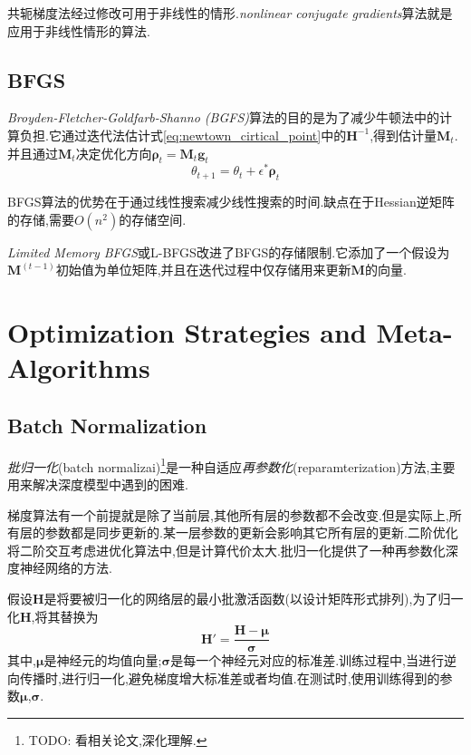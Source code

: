 共轭梯度法经过修改可用于非线性的情形.\textit{nonlinear conjugate gradients}算法就是应用于非线性情形的算法.

\subsection{BFGS}

\textit{Broyden-Fletcher-Goldfarb-Shanno (BGFS)}算法的目的是为了减少牛顿法中的计算负担.它通过迭代法估计式\ref{eq:newtown_cirtical_point}中的$\mathbf H^{-1}$,得到估计量$\mathbf M_t$.并且通过$\mathbf M_t$决定优化方向$\mathbf\rho_t=\mathbf M_t\mathbf g_t$
\begin{equation}
\theta_{t+1}=\theta_t+\epsilon^\ast\mathbf\rho_t
\end{equation}

BFGS算法的优势在于通过线性搜索减少线性搜索的时间.缺点在于Hessian逆矩阵的存储,需要$O(n^2)$的存储空间.

\textit{Limited Memory BFGS}或L-BFGS改进了BFGS的存储限制.它添加了一个假设为$\mathbf M^{(t-1)}$初始值为单位矩阵,并且在迭代过程中仅存储用来更新$\mathbf M$的向量.

\section{Optimization Strategies and Meta-Algorithms}

\subsection{Batch Normalization}

\textit{批归一化}(batch normalizai)\footnote{TODO: 看相关论文,深化理解.}是一种自适应\textit{再参数化}(reparamterization)方法,主要用来解决深度模型中遇到的困难.

梯度算法有一个前提就是除了当前层,其他所有层的参数都不会改变.但是实际上,所有层的参数都是同步更新的.某一层参数的更新会影响其它所有层的更新.二阶优化将二阶交互考虑进优化算法中,但是计算代价太大.批归一化提供了一种再参数化深度神经网络的方法.

假设$\mathbf H$是将要被归一化的网络层的最小批激活函数(以设计矩阵形式排列),为了归一化$\mathbf H$,将其替换为
\begin{equation}
\mathbf H'=\frac{\mathbf{H-\mu}}{\mathbf\sigma}
\end{equation}
其中,$\mathbf\mu$是神经元的均值向量;$\mathbf\sigma$是每一个神经元对应的标准差.训练过程中,当进行逆向传播时,进行归一化,避免梯度增大标准差或者均值.在测试时,使用训练得到的参数$\mathbf\mu$,$\mathbf\sigma$.

